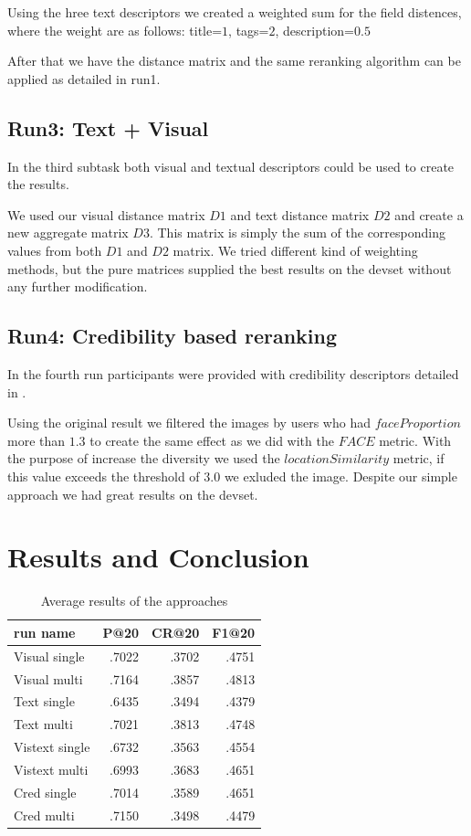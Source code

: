 \documentclass{sig-alternate}
\begin{document}
Using the hree text descriptors we created a weighted sum for the field distences, where the weight are as follows: title=$1$, tags=$2$, description=$0.5$

After that we have the distance matrix and the same reranking algorithm can be applied as detailed in run1.

\subsection{Run3: Text + Visual}
In the third subtask both visual and textual descriptors could be used to create the results.

We used our visual distance matrix $D1$ and text distance matrix $D2$ and create a new aggregate matrix $D3$. This matrix is simply the sum of the corresponding values from both $D1$ and $D2$ matrix. We tried different kind of weighting methods, but the pure matrices supplied the best results on the devset without any further modification.

\subsection{Run4: Credibility based reranking}
In the fourth run participants were provided with credibility descriptors detailed in \cite{Task2015}.

Using the original result we filtered the images by users who had $faceProportion$ more than $1.3$ to create the same effect as we did with the $FACE$ metric. With the purpose of increase the diversity we used the $locationSimilarity$ metric, if this value exceeds the threshold of $3.0$ we exluded the image. Despite our simple approach we had great results on the devset.

\section{Results and Conclusion}

\begin{table}[h]
	\centering
\begin{tabular}{|l|r|r|r|}
	\hline 
	run name & P@20 & CR@20 & F1@20\tabularnewline
	\hline 
	\hline 
	Visual single & .7022 & .3702 & .4751\tabularnewline
	\hline 
	Visual multi & .7164 & .3857 & .4813\tabularnewline
	\hline 
	Text single & .6435 & .3494 & .4379\tabularnewline
	\hline 
	Text multi & .7021 & .3813 & .4748\tabularnewline
	\hline 
	Vistext single & .6732 & .3563 & .4554\tabularnewline
	\hline 
	Vistext multi & .6993 & .3683 & .4651\tabularnewline
	\hline 
	Cred single & .7014 & .3589 & .4651\tabularnewline
	\hline 
	Cred multi & .7150 & .3498 & .4479\tabularnewline
	\hline 
\end{tabular}
\label{table:results}
\caption{Average results of the approaches}
\end{table}
\end{document}
